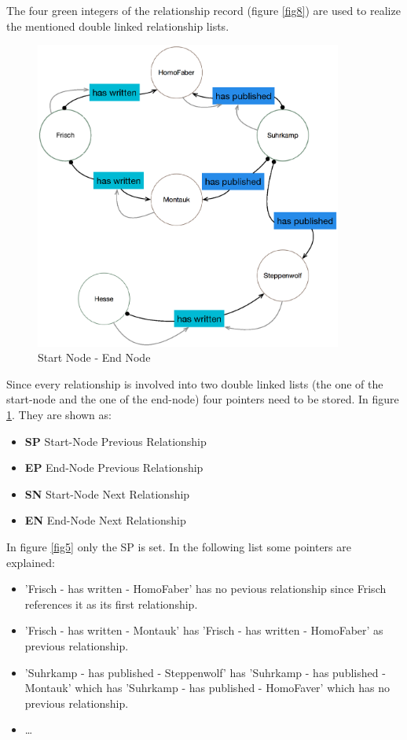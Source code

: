 The four green integers of the relationship record (figure \ref{fig8}) are used to realize the mentioned double linked relationship lists.
\begin{figure}
	\centering
 	 	\includegraphics[width=0.9\textwidth]{images/startEnd.eps}
	\caption{Start Node - End Node}
	\label{fig4}
\end{figure}

Since every relationship is involved into two double linked lists (the one of the start-node and the one of the end-node) four pointers need to be stored.
In figure \ref{fig4}. They are shown as:

\begin{itemize}
	\item \textbf{SP} Start-Node Previous Relationship
	\item \textbf{EP} End-Node Previous Relationship
	\item \textbf{SN} Start-Node Next Relationship
	\item \textbf{EN} End-Node Next Relationship
\end{itemize}

In figure \ref{fig5} only the SP is set. In the following list some pointers are explained:
\begin{itemize}
	\item 'Frisch - has written - HomoFaber' has no pevious relationship since Frisch references it as its first relationship.
	\item 'Frisch - has written - Montauk' has 'Frisch - has written - HomoFaber' as previous relationship.
	\item 'Suhrkamp - has published - Steppenwolf' has 'Suhrkamp - has published - Montauk' which has  'Suhrkamp - has published - HomoFaver' which has no previous relationship.
	\item \dots
\end{itemize}

